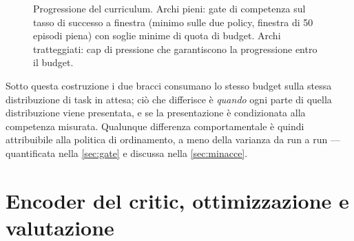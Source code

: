 \begin{figure}[t]
  \centering
  \caption{Progressione del curriculum. Archi pieni: gate di competenza
  sul tasso di successo a finestra (minimo sulle due policy, finestra di
  50 episodi piena) con soglie minime di quota di budget. Archi
  tratteggiati: cap di pressione che garantiscono la progressione entro
  il budget.}
  \label{fig:fsm}
\end{figure}


Sotto questa costruzione i due bracci consumano lo stesso budget sulla
stessa distribuzione di task in attesa; ciò che differisce è
\emph{quando} ogni parte di quella distribuzione viene presentata, e se
la presentazione è condizionata alla competenza misurata. Qualunque
differenza comportamentale è quindi attribuibile alla politica di
ordinamento, a meno della varianza da run a run --- quantificata nella
\cref{sec:gate} e discussa nella \cref{sec:minacce}.

\section{Encoder del critic, ottimizzazione e valutazione}
\label{sec:critic}

